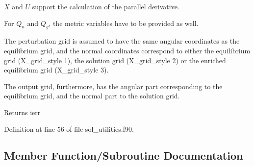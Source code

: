$X$ and $U$ support the calculation of the parallel derivative.

For $Q_n$ and $Q_g$, the metric variables have to be provided as well.

The perturbation grid is assumed to have the same angular coordinates as the equilibrium grid, and the normal coordinates correspond to either the equilibrium grid ({\ttfamily X\+\_\+grid\+\_\+style} 1), the solution grid ({\ttfamily X\+\_\+grid\+\_\+style} 2) or the enriched equilibrium grid ({\ttfamily X\+\_\+grid\+\_\+style} 3).

The output grid, furthermore, has the angular part corresponding to the equilibrium grid, and the normal part to the solution grid.

\begin{DoxyReturn}{Returns}
ierr 
\end{DoxyReturn}


Definition at line 56 of file sol\+\_\+utilities.\+f90.



\subsection{Member Function/\+Subroutine Documentation}
\mbox{\label{interfacesol__utilities_1_1calc__xuq_a17d7f9af7119c48b7203cf683f80d304}} 
